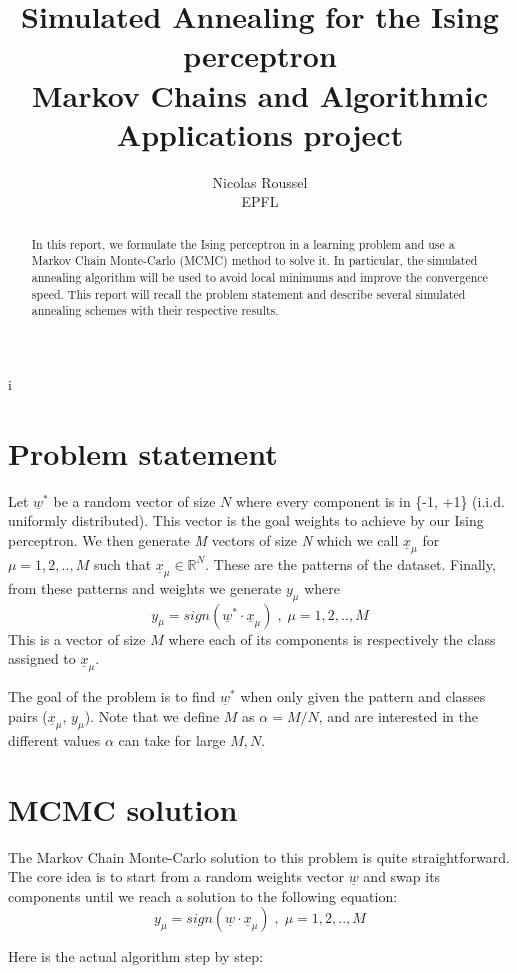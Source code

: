 i\documentclass[a4paper]{article}
\title{
Simulated Annealing for the Ising perceptron \\
Markov Chains and Algorithmic Applications project}
\author{
Nicolas Roussel\\
EPFL}
\begin{document}
\maketitle

\begin{abstract}
In this report, we formulate the Ising perceptron in a learning problem and use a Markov Chain Monte-Carlo (MCMC) method to solve it. In particular, the simulated annealing algorithm will be used to avoid local minimums and improve the convergence speed. This report will recall the problem statement and describe several simulated annealing schemes with their respective results.\end{abstract}

\section{Problem statement}

Let $\underline{w}^*$ be a random vector of size $N$ where every component is in \{-1, +1\} (i.i.d. uniformly distributed). This vector is the goal weights to achieve by our Ising perceptron. We then generate \textit{M} vectors of size \textit{N} which we call $\underline{x}_{\mu}$ for $\mu = 1, 2, .., M$ such that $\underline{x}_{\mu} \in \mathbb{R}^{N}$. These are the patterns of the dataset. Finally, from these patterns and weights we generate $y_{\mu}$ where
\[y_{\mu} = sign(\underline{w}^* \cdot \underline{x}_{\mu}) \;, \;\mu = 1, 2, .., M\]
This is a vector of size $M$ where each of its components is respectively the class assigned to $\underline{x}_{\mu}$.

The goal of the problem is to find $\underline{w}^*$ when only given the pattern and classes pairs ($\underline{x}_{\mu}$, $y_{\mu}$). Note that we define $M$ as $\alpha = M/N$, and are interested in the different values $\alpha$ can take for large $M, N$.  

\section{MCMC solution}\label{MCMC_SOL}

The Markov Chain Monte-Carlo solution to this problem is quite straightforward. The core idea is to start from a random weights vector $\underline{w}$ and swap its components until we reach a solution to the following equation: 
 \[y_{\mu} = sign(\underline{w} \cdot \underline{x}_{\mu}) \;, \;\mu = 1, 2, .., M\]
 
 Here is the actual algorithm step by step:
 
\end{document}
